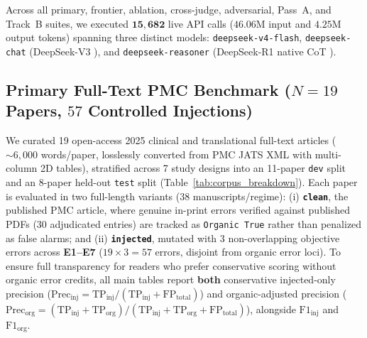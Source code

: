 \documentclass[11pt,a4paper]{article}
\begin{document}
Across all primary, frontier, ablation, cross-judge, adversarial, Pass~A, and Track~B suites, we executed $\mathbf{15{,}682}$ live API calls ($46.06\text{M}$ input and $4.25\text{M}$ output tokens) spanning three distinct models: \texttt{deepseek-v4-flash}, \texttt{deepseek-chat} (DeepSeek-V3 \cite{deepseekv3_2024}), and \texttt{deepseek-reasoner} (DeepSeek-R1 native CoT \cite{deepseekr1_2025}).

\subsection{Primary Full-Text PMC Benchmark (\texorpdfstring{$N=19$}{N=19} Papers, \texorpdfstring{$57$}{57} Controlled Injections)}
We curated 19 open-access 2025 clinical and translational full-text articles ($\sim 6{,}000$ words/paper, losslessly converted from PMC JATS XML with multi-column 2D tables), stratified across 7 study designs into an 11-paper \texttt{dev} split and an 8-paper held-out \texttt{test} split (Table~\ref{tab:corpus_breakdown}). Each paper is evaluated in two full-length variants ($38$ manuscripts/regime): (i) \textbf{\texttt{clean}}, the published PMC article, where genuine in-print errors verified against published PDFs ($30$ adjudicated entries) are tracked as \texttt{Organic True} rather than penalized as false alarms; and (ii) \textbf{\texttt{injected}}, mutated with $3$ non-overlapping objective errors across \textbf{E1--E7} ($19 \times 3 = 57$ errors, disjoint from organic error loci). To ensure full transparency for readers who prefer conservative scoring without organic error credits, all main tables report \textbf{both} conservative injected-only precision ($\text{Prec}_{\text{inj}} = \text{TP}_{\text{inj}} / (\text{TP}_{\text{inj}} + \text{FP}_{\text{total}})$) and organic-adjusted precision ($\text{Prec}_{\text{org}} = (\text{TP}_{\text{inj}} + \text{TP}_{\text{org}}) / (\text{TP}_{\text{inj}} + \text{TP}_{\text{org}} + \text{FP}_{\text{total}})$), alongside $\text{F1}_{\text{inj}}$ and $\text{F1}_{\text{org}}$.
\end{document}
